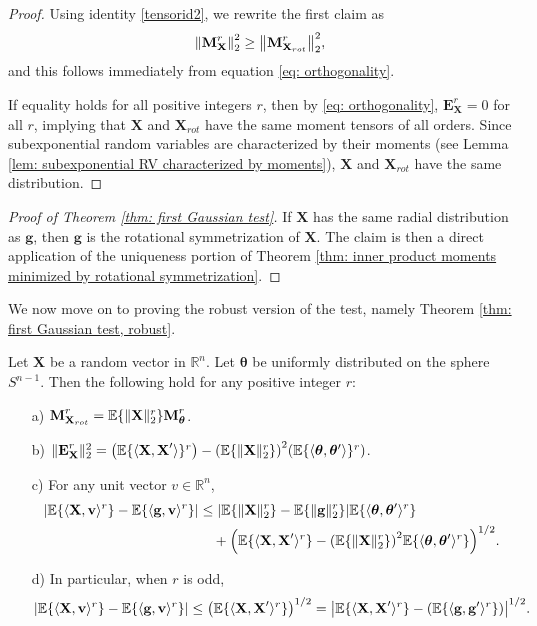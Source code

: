 \documentclass[final,12pt]{colt2018} %
\numberwithin{equation}{section}
\DeclarePairedDelimiter{\abs}{\lvert}{\rvert}
\DeclarePairedDelimiter{\norm}{\lVert}{\rVert}
\DeclarePairedDelimiter{\paren}{(}{)}
\DeclarePairedDelimiter{\braces}{\lbrace}{\rbrace}
\DeclarePairedDelimiter{\inprod}{\langle}{\rangle}
\newcommand{\E}{\mathbb{E}}
\newcommand{\R}{\mathbb{R}}
\newcommand{\boldg}{\textbf{g}}
\newcommand{\boldv}{\textbf{v}}
\newcommand{\boldtheta}{\boldsymbol{\theta}}
\newcommand{\boldX}{\textbf{X}}
\newcommand{\boldM}{\textbf{M}}
\begin{document}
\begin{proof}
	Using identity \eqref{tensorid2}, we rewrite the first claim as
	\[
	\norm*{\boldM^r_\boldX}_2^2 \geq \norm*{\boldM^r_{\boldX_{rot}}}_2^2,
	\]
	and this follows immediately from equation \eqref{eq: orthogonality}.
	
	If equality holds for all positive integers $r$, then by \eqref{eq: orthogonality}, $\textbf{E}^r_\boldX = 0$ for all $r$, implying that $\boldX$ and $\boldX_{rot}$ have the same moment tensors of all orders. Since subexponential random variables are characterized by their moments (see Lemma \ref{lem: subexponential RV characterized by moments}), $\boldX$ and $\boldX_{rot}$ have the same distribution.
\end{proof}

\begin{proof}[Proof of Theorem \ref{thm: first Gaussian test}]
	If $\boldX$ has the same radial distribution as $\boldg$, then $\boldg$ is the rotational symmetrization of $\boldX$. The claim is then a direct application of the uniqueness portion of Theorem \ref{thm: inner product moments minimized by rotational symmetrization}.
\end{proof}

We now move on to proving the robust version of the test, namely Theorem \ref{thm: first Gaussian test, robust}.

\begin{lemma} \label{lem: moment deviation}
	Let $\boldX$ be a random vector in $\R^n$. Let $\boldtheta$ be uniformly distributed on the sphere $S^{n-1}$. Then the following hold for any positive integer $r$:
	\begin{enumerate}[nosep]
		\item[a)] $\boldM^r_{\boldX_{rot}} = \E\braces{\norm{\boldX}_2^r}\boldM_{\boldtheta}^r$.
		\item[b)] $\norm{\textbf{E}^r_\boldX}^2_2 = \paren*{\E\braces{\inprod{\boldX,\boldX'}}^r} - \paren*{\E\braces{\norm{\boldX}^r_2}}^2\paren*{\E\braces{\inprod{\boldtheta,\boldtheta'}}^r}$.
		\item[c)] For any unit vector $v \in \R^n$,
		\begin{align} \label{moment deviation bound}
		\abs*{\E\braces{\inprod{\boldX,\boldv}^r} - \E\braces{\inprod{\boldg,\boldv}^r}} & \leq \abs*{\E\braces{\norm{\boldX}_2^r}-\E\braces{\norm{\boldg}_2^r}}\E\braces{\inprod{\boldtheta,\boldtheta'}^r} \\ \nonumber
		& \quad + \paren*{\E\braces{\inprod{\boldX,\boldX'}^r} - \paren*{\E\braces{\norm{\boldX}^r_2}}^2\E\braces{\inprod{\boldtheta,\boldtheta'}^r}}^{1/2}.
		\end{align}
		\item[d)] In particular, when $r$ is odd,
		\begin{align} \label{odd moment deviation}
		\abs*{\E\braces{\inprod{\boldX,\boldv}^r} - \E\braces{\inprod{\boldg,\boldv}^r}} \leq \paren*{\E\braces{\inprod{\boldX,\boldX'}^r}}^{1/2} = \abs*{\E\braces{\inprod{\boldX,\boldX'}^r} - \paren*{\E\braces{\inprod{\boldg,\boldg'}^r}}}^{1/2}.
		\end{align}		
	\end{enumerate}
\end{lemma}
\end{document}
